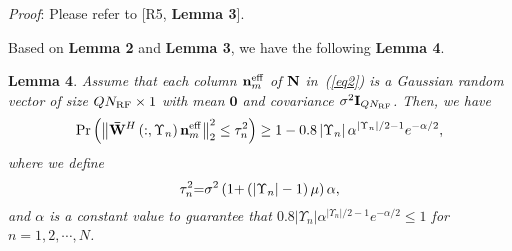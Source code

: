 \documentclass[a4paper,12pt]{article}
\begin{document}
{\begin{framed}
{{\it Proof}: Please refer to [R5, \textbf{Lemma 3}].

Based on \textbf{Lemma 2} and \textbf{Lemma 3}, we have the following \textbf{Lemma 4}.

\textbf{Lemma 4}. {\it Assume that each column ${{\bf{n}}_m^{{\rm{eff}}}}$ of ${{\bf{N}}}$ in~(\ref{eq2}) is a Gaussian random vector of size ${Q{N_{{\rm{RF}}}} \times 1}$ with mean ${\mathbf{0}}$ and covariance ${{\sigma ^2}{{\bf{I}}_{Q{N_{{\rm{RF}}}}}}}$. Then, we have}
\begin{equation}\label{eq10}
\Pr \left( {\left\| {{{{\bf{\bar W}}}^H}\left( {:,{\Upsilon _n}} \right){\bf{n}}_m^{{\rm{eff}}}} \right\|_2^2 \le \tau _n^2} \right) \ge 1 - 0.8\left| {{\Upsilon _n}} \right|{\alpha ^{\left| {{\Upsilon _n}} \right|/2 - 1}}{e^{ - \alpha /2}},
\end{equation}
{\it where we define}
\begin{equation}\label{eq11}
\tau _n^2{\rm{ = }}{\sigma ^2}\left( {1{\rm{ + }}\left( {\left| {{\Upsilon _n}} \right| - 1} \right)\mu } \right)\alpha ,
\end{equation}
{\it and ${\alpha}$ is a constant value to guarantee that ${0.8\left| {{\Upsilon _n}} \right|{\alpha ^{\left| {{\Upsilon _n}} \right|/2 - 1}}{e^{ - \alpha /2}} \le 1}$ for ${n = 1,2, \cdots ,N}$.}

}
\end{framed}}
\end{document}
